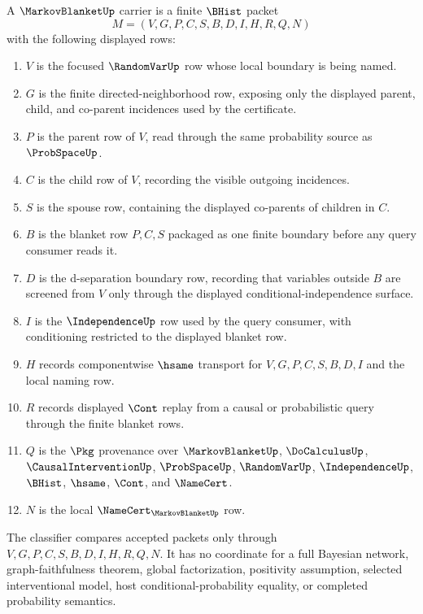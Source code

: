 \begin{definition}
\label{def:markov-blanket-carrier}
A $\MarkovBlanketUp$ carrier is a finite $\BHist$ packet
$$
M=(V,G,P,C,S,B,D,I,H,R,Q,N)
$$
with the following displayed rows:
\begin{enumerate}
\item $V$ is the focused $\RandomVarUp$ row whose local boundary is being named.
\item $G$ is the finite directed-neighborhood row, exposing only the displayed parent, child, and co-parent incidences used by the certificate.
\item $P$ is the parent row of $V$, read through the same probability source as $\ProbSpaceUp$.
\item $C$ is the child row of $V$, recording the visible outgoing incidences.
\item $S$ is the spouse row, containing the displayed co-parents of children in $C$.
\item $B$ is the blanket row $P,C,S$ packaged as one finite boundary before any query consumer reads it.
\item $D$ is the d-separation boundary row, recording that variables outside $B$ are screened from $V$ only through the displayed conditional-independence surface.
\item $I$ is the $\IndependenceUp$ row used by the query consumer, with conditioning restricted to the displayed blanket row.
\item $H$ records componentwise $\hsame$ transport for $V,G,P,C,S,B,D,I$ and the local naming row.
\item $R$ records displayed $\Cont$ replay from a causal or probabilistic query through the finite blanket rows.
\item $Q$ is the $\Pkg$ provenance over $\MarkovBlanketUp$, $\DoCalculusUp$, $\CausalInterventionUp$, $\ProbSpaceUp$, $\RandomVarUp$, $\IndependenceUp$, $\BHist$, $\hsame$, $\Cont$, and $\NameCert$.
\item $N$ is the local $\NameCert_{\MarkovBlanketUp}$ row.
\end{enumerate}
The classifier compares accepted packets only through $V,G,P,C,S,B,D,I,H,R,Q,N$. It has no coordinate for a full Bayesian network, graph-faithfulness theorem, global factorization, positivity assumption, selected interventional model, host conditional-probability equality, or completed probability semantics.
\end{definition}


